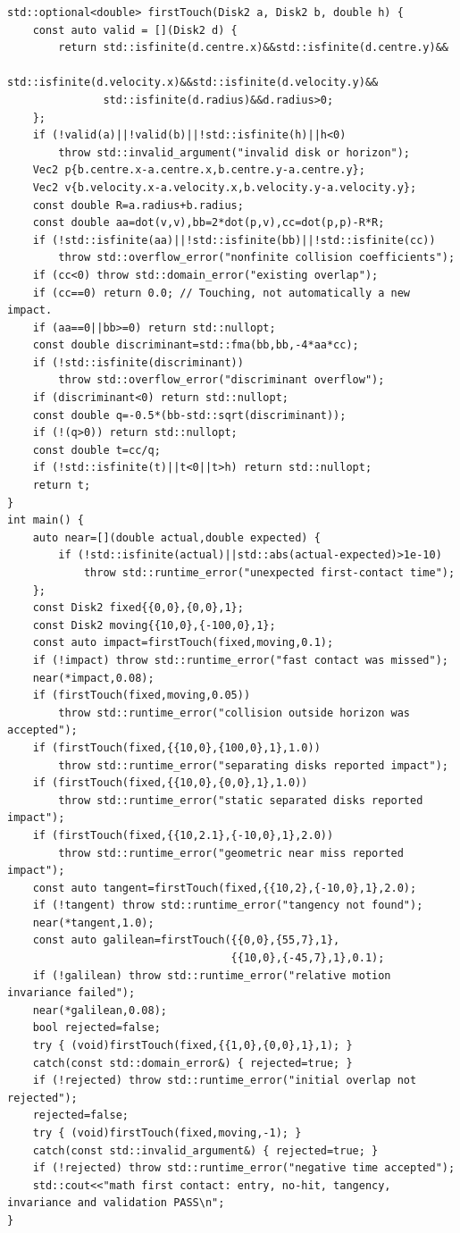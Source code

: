 \begin{verbatim}
std::optional<double> firstTouch(Disk2 a, Disk2 b, double h) {
    const auto valid = [](Disk2 d) {
        return std::isfinite(d.centre.x)&&std::isfinite(d.centre.y)&&
               std::isfinite(d.velocity.x)&&std::isfinite(d.velocity.y)&&
               std::isfinite(d.radius)&&d.radius>0;
    };
    if (!valid(a)||!valid(b)||!std::isfinite(h)||h<0)
        throw std::invalid_argument("invalid disk or horizon");
    Vec2 p{b.centre.x-a.centre.x,b.centre.y-a.centre.y};
    Vec2 v{b.velocity.x-a.velocity.x,b.velocity.y-a.velocity.y};
    const double R=a.radius+b.radius;
    const double aa=dot(v,v),bb=2*dot(p,v),cc=dot(p,p)-R*R;
    if (!std::isfinite(aa)||!std::isfinite(bb)||!std::isfinite(cc))
        throw std::overflow_error("nonfinite collision coefficients");
    if (cc<0) throw std::domain_error("existing overlap");
    if (cc==0) return 0.0; // Touching, not automatically a new impact.
    if (aa==0||bb>=0) return std::nullopt;
    const double discriminant=std::fma(bb,bb,-4*aa*cc);
    if (!std::isfinite(discriminant))
        throw std::overflow_error("discriminant overflow");
    if (discriminant<0) return std::nullopt;
    const double q=-0.5*(bb-std::sqrt(discriminant));
    if (!(q>0)) return std::nullopt;
    const double t=cc/q;
    if (!std::isfinite(t)||t<0||t>h) return std::nullopt;
    return t;
}
int main() {
    auto near=[](double actual,double expected) {
        if (!std::isfinite(actual)||std::abs(actual-expected)>1e-10)
            throw std::runtime_error("unexpected first-contact time");
    };
    const Disk2 fixed{{0,0},{0,0},1};
    const Disk2 moving{{10,0},{-100,0},1};
    const auto impact=firstTouch(fixed,moving,0.1);
    if (!impact) throw std::runtime_error("fast contact was missed");
    near(*impact,0.08);
    if (firstTouch(fixed,moving,0.05))
        throw std::runtime_error("collision outside horizon was accepted");
    if (firstTouch(fixed,{{10,0},{100,0},1},1.0))
        throw std::runtime_error("separating disks reported impact");
    if (firstTouch(fixed,{{10,0},{0,0},1},1.0))
        throw std::runtime_error("static separated disks reported impact");
    if (firstTouch(fixed,{{10,2.1},{-10,0},1},2.0))
        throw std::runtime_error("geometric near miss reported impact");
    const auto tangent=firstTouch(fixed,{{10,2},{-10,0},1},2.0);
    if (!tangent) throw std::runtime_error("tangency not found");
    near(*tangent,1.0);
    const auto galilean=firstTouch({{0,0},{55,7},1},
                                   {{10,0},{-45,7},1},0.1);
    if (!galilean) throw std::runtime_error("relative motion invariance failed");
    near(*galilean,0.08);
    bool rejected=false;
    try { (void)firstTouch(fixed,{{1,0},{0,0},1},1); }
    catch(const std::domain_error&) { rejected=true; }
    if (!rejected) throw std::runtime_error("initial overlap not rejected");
    rejected=false;
    try { (void)firstTouch(fixed,moving,-1); }
    catch(const std::invalid_argument&) { rejected=true; }
    if (!rejected) throw std::runtime_error("negative time accepted");
    std::cout<<"math first contact: entry, no-hit, tangency, invariance and validation PASS\n";
}
\end{verbatim}

